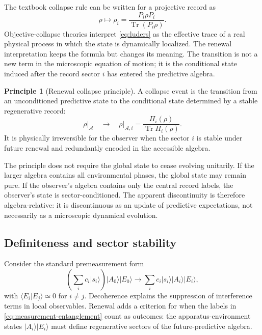 \documentclass[11pt]{article}
\numberwithin{equation}{section}
\theoremstyle{definition}
\newtheorem{principle}[theorem]{Principle}
\theoremstyle{remark}
\newcommand{\Aalg}{\mathcal A}
\newcommand{\Tr}{\operatorname{Tr}}
\begin{document}
The textbook collapse rule can be written for a projective record as
\begin{equation}
\label{eq:luders}
  \rho\longmapsto \rho_i=\frac{P_i\rho P_i}{\Tr(P_i\rho)}.
\end{equation}
Objective-collapse theories interpret \eqref{eq:luders} as the effective trace of a real physical process in which the state is dynamically localized.  The renewal interpretation keeps the formula but changes its meaning.  The transition is not a new term in the microscopic equation of motion; it is the conditional state induced after the record sector \(i\) has entered the predictive algebra.

\begin{principle}[Renewal collapse principle]
\label{principle:collapse}
A collapse event is the transition from an unconditioned predictive state to the conditional state determined by a stable regenerative record:
\begin{equation}
\label{eq:renewal-collapse}
  \rho\big|_{\Aalg}
  \quad\longrightarrow\quad
  \rho\big|_{\Aalg,i}
  =\frac{\Pi_i(\rho)}{\Tr\Pi_i(\rho)}.
\end{equation}
It is physically irreversible for the observer when the sector \(i\) is stable under future renewal and redundantly encoded in the accessible algebra.
\end{principle}

The principle does not require the global state to cease evolving unitarily.  If the larger algebra contains all environmental phases, the global state may remain pure.  If the observer's algebra contains only the central record labels, the observer's state is sector-conditioned.  The apparent discontinuity is therefore algebra-relative: it is discontinuous as an update of predictive expectations, not necessarily as a microscopic dynamical evolution.

\subsection{Definiteness and sector stability}

Consider the standard premeasurement form
\begin{equation}
\label{eq:measurement-entanglement}
  \left(\sum_i c_i |s_i\rangle\right)|A_0\rangle|E_0\rangle
  \longrightarrow
  \sum_i c_i |s_i\rangle |A_i\rangle |E_i\rangle,
\end{equation}
with \(\langle E_i|E_j\rangle\simeq0\) for \(i\ne j\).  Decoherence explains the suppression of interference terms in local observables.  Renewal adds a criterion for when the labels in \eqref{eq:measurement-entanglement} count as outcomes: the apparatus-environment states \(|A_i\rangle|E_i\rangle\) must define regenerative sectors of the future-predictive algebra.
\end{document}
